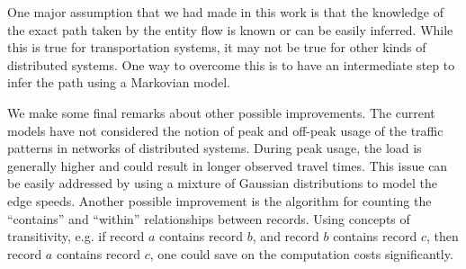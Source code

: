 \documentclass[conference]{IEEEtran.1.8}
\begin{document}
One major assumption that we had made in this work is that the knowledge of the exact path taken by the entity flow is known or can be easily inferred. While this is true for transportation systems, it may not be true for other kinds of distributed systems. One way to overcome this is to have an intermediate step to infer the path using a Markovian model. 

We make some final remarks about other possible improvements. The current models have not considered the notion of peak and off-peak usage of the traffic patterns in networks of distributed systems. During peak usage, the load is generally higher and could result in longer observed travel times. This issue can be easily addressed by using a mixture of Gaussian distributions to model the edge speeds. Another possible improvement is the algorithm for counting the ``contains'' and ``within'' relationships between records. Using concepts of transitivity, e.g. if record $a$ contains record $b$, and record $b$ contains record $c$, then record $a$ contains record $c$, one could save on the computation costs significantly.



\end{document}
